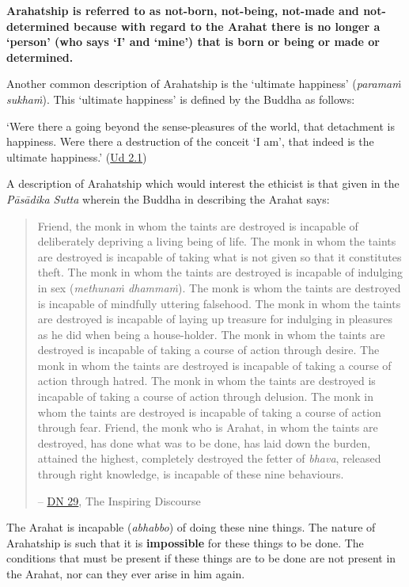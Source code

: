 \textbf{Arahatship is referred to as not-born, not-being, not-made and not-determined because with regard to the Arahat there is no longer a `person' (who says `I' and `mine') that is born or being or made or determined.}

Another common description of Arahatship is the `ultimate happiness' (\emph{paramaṁ sukhaṁ}). This `ultimate happiness' is defined by the Buddha as follows:

`Were there a going beyond the sense-pleasures of the world, that detachment is happiness. Were there a destruction of the conceit `I am', that indeed is the ultimate happiness.' (\href{https://suttacentral.net/ud2.1/en/anandajoti}{Ud 2.1})

A description of Arahatship which would interest the ethicist is that given in the \emph{Pāsādika Sutta} wherein the Buddha in describing the Arahat says:

\begin{quote}
Friend, the monk in whom the taints are destroyed is incapable of deliberately depriving a living being of life. The monk in whom the taints are destroyed is incapable of taking what is not given so that it constitutes theft. The monk in whom the taints are destroyed is incapable of indulging in sex (\emph{methunaṁ dhammaṁ}). The monk is whom the taints are destroyed is incapable of mindfully uttering falsehood. The monk in whom the taints are destroyed is incapable of laying up treasure for indulging in pleasures as he did when being a house-holder. The monk in whom the taints are destroyed is incapable of taking a course of action through desire. The monk in whom the taints are destroyed is incapable of taking a course of action through hatred. The monk in whom the taints are destroyed is incapable of taking a course of action through delusion. The monk in whom the taints are destroyed is incapable of taking a course of action through fear. Friend, the monk who is Arahat, in whom the taints are destroyed, has done what was to be done, has laid down the burden, attained the highest, completely destroyed the fetter of \emph{bhava}, released through right knowledge, is incapable of these nine behaviours.

 -- \href{https://suttacentral.net/dn29/en/thanissaro}{DN 29}, The Inspiring Discourse
\end{quote}

The Arahat is incapable (\emph{abhabbo}) of doing these nine things. The nature of Arahatship is such that it is \textbf{impossible} for these things to be done. The conditions that must be present if these things are to be done are not present in the Arahat, nor can they ever arise in him again.


